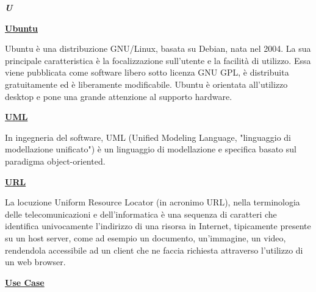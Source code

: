 \newpage

\cleardoublepage
{}
{}
\noindent\hrulefill\hspace{4mm}\textbf{\textsl{\Huge{U}}}\hspace{4mm}\hrulefill
\vspace*{2\bigskipamount}	

\begin{addmargin}[0em]{0em}
	\textbf{\underline{Ubuntu}}
\end{addmargin}

\medskip
\begin{addmargin}[5em]{1em}
Ubuntu è una distribuzione GNU/Linux, basata su Debian, nata nel 2004. La sua principale caratteristica è la focalizzazione sull'utente e la facilità di utilizzo. Essa viene pubblicata come software libero sotto licenza GNU GPL, è distribuita gratuitamente ed è liberamente modificabile. Ubuntu è orientata all'utilizzo desktop e pone una grande attenzione al supporto hardware.
\end{addmargin}	

\bigskip
\begin{addmargin}[0em]{0em}	
	\textbf{\underline{UML}}
\end{addmargin}

\medskip
\begin{addmargin}[5em]{1em}
In ingegneria del software, UML (Unified Modeling Language, "linguaggio di modellazione unificato") è un linguaggio di modellazione e specifica basato sul paradigma object-oriented.
\end{addmargin}	

\bigskip
\begin{addmargin}[0em]{0em}	
	\textbf{\underline{URL}}
\end{addmargin}

\medskip
\begin{addmargin}[5em]{1em}
La locuzione Uniform Resource Locator (in acronimo URL), nella terminologia delle telecomunicazioni e dell'informatica è una sequenza di caratteri che identifica univocamente l'indirizzo di una risorsa in Internet, tipicamente presente su un host server, come ad esempio un documento, un'immagine, un video, rendendola accessibile ad un client che ne faccia richiesta attraverso l'utilizzo di un web browser.
\end{addmargin}
 
\bigskip
\begin{addmargin}[0em]{0em}
	\textbf{\underline{Use Case}} 
\end{addmargin}

